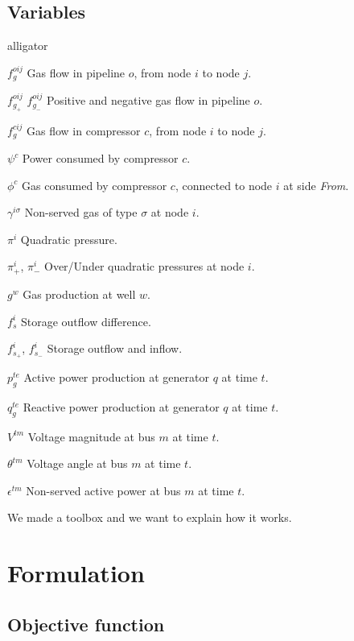 \subsection*{Variables}

\begin{labeling}{alligator}
\item [${f}_{g}^{oij}$] Gas flow in pipeline $o$, from node $i$ to node $j$.
\item [${f}_{g_+}^{oij}$ ${f}_{g_-}^{oij}$] Positive and negative gas flow in pipeline $o$.
\item [${f}_{g}^{cij}$] Gas flow in compressor $c$, from node $i$ to node $j$.
\item [$\psi^{c}$] Power consumed by compressor $c$.
\item [$\phi^{c}$] Gas consumed by compressor $c$, connected to node $i$ at side \textit{From}.
\item [$\gamma^{i \sigma}$] Non-served gas of type $\sigma$ at node $i$.
\item [$\pi^{i}$] Quadratic pressure.
\item [${\pi}^{i}_{+}$, ${\pi}^{i}_{-}$] Over/Under quadratic pressures at node $i$.
\item [$g^{w}$] Gas production at well $w$.
\item [$f_{s}^{i}$] Storage outflow difference.
\item [$f_{s_+}^{i}$, $f_{s_-}^{i}$] Storage outflow and inflow.
\item [$p_{g}^{te}$] Active power production at generator $q$ at time $t$.
\item [$q_{g}^{te}$] Reactive power production at generator $q$ at time $t$.
\item [$V^{tm}$] Voltage magnitude at bus $m$ at time $t$.
\item [$\theta^{tm}$] Voltage angle at bus $m$ at time $t$.
\item [$\epsilon^{tm}$] Non-served active power at bus $m$ at time $t$.
\end{labeling}






We made a toolbox and we want to explain how it works.

\section{Formulation}

\subsection{Objective function}

